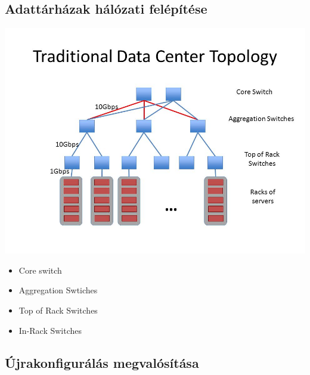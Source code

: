 \documentclass[12pt]{report}
\begin{document}
\subsection{Adattárházak hálózati felépítése}

\begin{center}
	\includegraphics[width=0.7\linewidth]{pictures/Traditional+Data+Center+Topology.jpg}
\end{center}

\begin{itemize}
	\item Core switch
	\item Aggregation Swtiches
	\item Top of Rack Switches
	\item In-Rack Switches
\end{itemize}

\subsection{Újrakonfigurálás megvalósítása}
\end{document}
